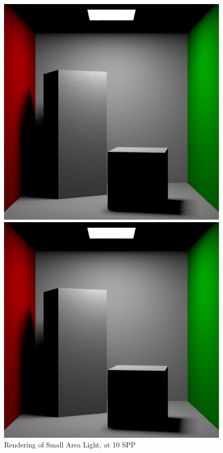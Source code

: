 \documentclass[a4paper]{myarticle}
\begin{document}
\begin{figure}[H]
  \begin{minipage}[t]{.3\textwidth}
      \centering
      \includegraphics[width=\textwidth]{q3/small_2_10.png}
      \caption{Rendering of Small Area Light, at 10 SPP}
  \end{minipage}
  \hfill
  \begin{minipage}[t]{.3\textwidth}
      \centering
      \includegraphics[width=\textwidth]{q3/small_2_100.png}

\end{minipage}
\end{figure}
\end{document}
